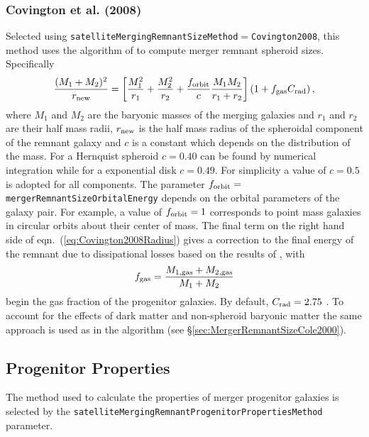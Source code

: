 \subsubsection{Covington et al. (2008)}

Selected using {\tt satelliteMergingRemnantSizeMethod}$=${\tt Covington2008}, this method uses the algorithm of \cite{covington_predicting_2008} to compute merger remnant spheroid sizes. Specifically
\begin{equation}
\frac{(M_1+M_2)^2}{ r_{\rm new}} =
\left[ \frac{M_1^2}{r_1} + \frac{M_2^2}{r_2} + \frac{ f_{\rm orbit}}{c}
\frac{M_1 M_2}{r_1+r_2}\right] \left( 1 + f_{\rm gas} C_{\rm rad} \right),
\label{eq:Covington2008Radius}
\end{equation}
where $M_1$ and $M_2$ are the baryonic masses of the merging galaxies and $r_1$
and $r_2$ are their half mass radii, $r_{\rm new}$ is the half mass radius of the spheroidal \gls{component} of the remnant galaxy and $c$ is a constant which depends on the distribution of the mass. For a Hernquist spheroid $c=0.40$ can be found by numerical integration while for a exponential disk $c=0.49$. For simplicity a value of $c=0.5$ is adopted for all components. The parameter $f_{\rm orbit}=${\tt mergerRemnantSizeOrbitalEnergy} depends on the orbital parameters of the galaxy pair. For example, a value of $f_{\rm orbit} = 1$ corresponds to point mass galaxies in circular orbits about their center of mass. The final term on the right hand side of eqn.~(\ref{eq:Covington2008Radius}) gives a correction to the final energy of the remnant due to dissipational losses based on the results of \cite{covington_effects_2011}, with
\begin{equation}
 f_{\rm gas} = {M_{\rm 1,gas}+M_{\rm 2,gas} \over M_1+M_2}
\end{equation}
begin the gas fraction of the progenitor galaxies. By default, $C_{\rm rad}=2.75$ \citep{covington_effects_2011}. To account for the effects of dark matter and non-spheroid baryonic matter the same approach is used as in the \cite{cole_hierarchical_2000} algorithm (see \S\ref{sec:MergerRemnantSizeCole2000}). 

\subsection{Progenitor Properties}

The method used to calculate the properties of merger progenitor galaxies is selected by the {\tt satelliteMergingRemnantProgenitorPropertiesMethod} parameter.

